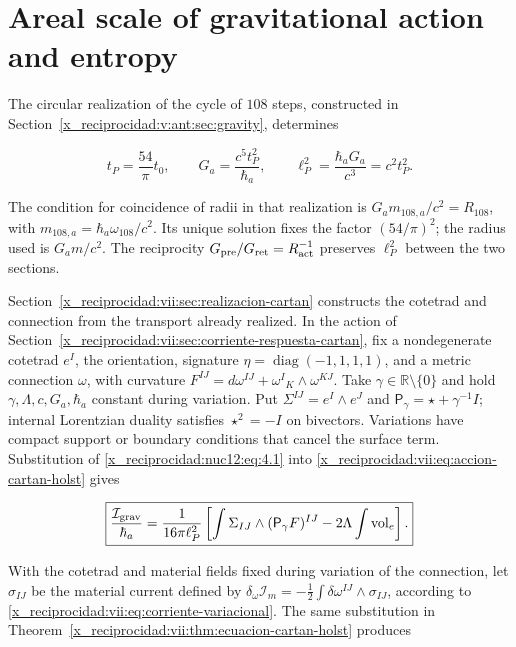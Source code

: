 \section{Areal scale of gravitational action and entropy}

The circular realization of the cycle of \(108\) steps, constructed in Section~\ref{x_reciprocidad:v:ant:sec:gravity}, determines



\begin{equation}
t_P=\frac{54}{\pi}t_0,\qquad
G_a=\frac{c^5t_P^2}{\hbar_a},\qquad
\ell_P^2=\frac{\hbar_aG_a}{c^3}=c^2t_P^2.
\label{x_reciprocidad:nuc12:eq:4.1}
\end{equation}



The condition for coincidence of radii in that realization is \(G_a m_{108,a}/c^2=R_{108}\), with \(m_{108,a}=\hbar_a\omega_{108}/c^2\). Its unique solution fixes the factor \((54/\pi)^2\); the radius used is \(G_a m/c^2\). The reciprocity \(G_{\rm pre}/G_{\rm ret}=R_{\rm act}^{-1}\) preserves \(\ell_P^2\) between the two sections.

Section~\ref{x_reciprocidad:vii:sec:realizacion-cartan} constructs the cotetrad and connection from the transport already realized. In the action of Section~\ref{x_reciprocidad:vii:sec:corriente-respuesta-cartan}, fix a nondegenerate cotetrad \(e^I\), the orientation, signature \(\eta=\operatorname{diag}(-1,1,1,1)\), and a metric connection \(\omega\), with curvature \(F^{IJ}=d\omega^{IJ}+\omega^I{}_{K}\wedge\omega^{KJ}\). Take \(\gamma\in\mathbb R\setminus\{0\}\) and hold \(\gamma,\Lambda,c,G_a,\hbar_a\) constant during variation. Put \(\Sigma^{IJ}=e^I\wedge e^J\) and \(\mathsf P_\gamma=\star+\gamma^{-1}I\); internal Lorentzian duality satisfies \(\star^2=-I\) on bivectors. Variations have compact support or boundary conditions that cancel the surface term. Substitution of \eqref{x_reciprocidad:nuc12:eq:4.1} into \eqref{x_reciprocidad:vii:eq:accion-cartan-holst} gives



\begin{equation}
\boxed{\frac{\mathcal I_{\rm grav}}{\hbar_a}
=\frac1{16\pi\ell_P^2}
\left[\int\Sigma_{IJ}\wedge(\mathsf P_\gamma F)^{IJ}
-2\Lambda\int\operatorname{vol}_e\right].}
\label{x_reciprocidad:nuc12:eq:4.2}
\end{equation}



With the cotetrad and material fields fixed during variation of the connection, let \(\sigma_{IJ}\) be the material current defined by \(\delta_\omega\mathcal I_m=-\tfrac12\int\delta\omega^{IJ}\wedge\sigma_{IJ}\), according to \eqref{x_reciprocidad:vii:eq:corriente-variacional}. The same substitution in Theorem~\ref{x_reciprocidad:vii:thm:ecuacion-cartan-holst} produces



